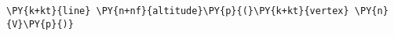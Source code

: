 \begin{Verbatim}[commandchars=\\\{\}]
    \PY{k+kt}{line} \PY{n+nf}{altitude}\PY{p}{(}\PY{k+kt}{vertex} \PY{n}{V}\PY{p}{)}
\end{Verbatim}
